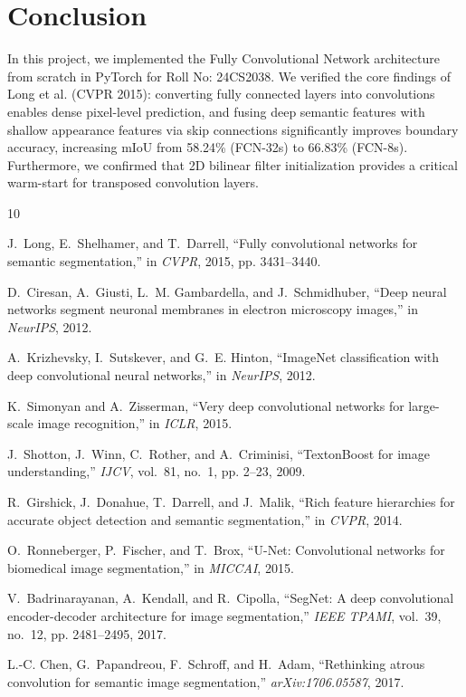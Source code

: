 \documentclass[conference]{IEEEtran}
\begin{document}
\section{Conclusion}
In this project, we implemented the Fully Convolutional Network architecture from scratch in PyTorch for Roll No: 24CS2038. We verified the core findings of Long et al. (CVPR 2015): converting fully connected layers into convolutions enables dense pixel-level prediction, and fusing deep semantic features with shallow appearance features via skip connections significantly improves boundary accuracy, increasing mIoU from 58.24\% (FCN-32s) to 66.83\% (FCN-8s). Furthermore, we confirmed that 2D bilinear filter initialization provides a critical warm-start for transposed convolution layers.


\begin{thebibliography}{10}

J.~Long, E.~Shelhamer, and T.~Darrell, ``Fully convolutional networks for semantic segmentation,'' in \emph{CVPR}, 2015, pp. 3431--3440.

D.~Ciresan, A.~Giusti, L.~M. Gambardella, and J.~Schmidhuber, ``Deep neural networks segment neuronal membranes in electron microscopy images,'' in \emph{NeurIPS}, 2012.

A.~Krizhevsky, I.~Sutskever, and G.~E. Hinton, ``ImageNet classification with deep convolutional neural networks,'' in \emph{NeurIPS}, 2012.

K.~Simonyan and A.~Zisserman, ``Very deep convolutional networks for large-scale image recognition,'' in \emph{ICLR}, 2015.

J.~Shotton, J.~Winn, C.~Rother, and A.~Criminisi, ``TextonBoost for image understanding,'' \emph{IJCV}, vol.~81, no.~1, pp. 2--23, 2009.

R.~Girshick, J.~Donahue, T.~Darrell, and J.~Malik, ``Rich feature hierarchies for accurate object detection and semantic segmentation,'' in \emph{CVPR}, 2014.

O.~Ronneberger, P.~Fischer, and T.~Brox, ``U-Net: Convolutional networks for biomedical image segmentation,'' in \emph{MICCAI}, 2015.

V.~Badrinarayanan, A.~Kendall, and R.~Cipolla, ``SegNet: A deep convolutional encoder-decoder architecture for image segmentation,'' \emph{IEEE TPAMI}, vol.~39, no.~12, pp. 2481--2495, 2017.

L.-C. Chen, G.~Papandreou, F.~Schroff, and H.~Adam, ``Rethinking atrous convolution for semantic image segmentation,'' \emph{arXiv:1706.05587}, 2017.

\end{thebibliography}
\end{document}
